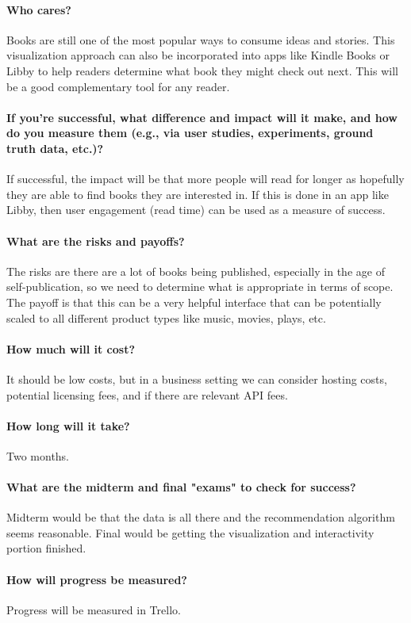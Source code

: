 \paragraph{Who cares?}Books are still one of the most popular ways to consume ideas and stories. This visualization approach can also be incorporated into apps like Kindle Books or Libby to help readers determine what book they might check out next. This will be a good complementary tool for any reader.
 
\paragraph{If you're successful, what difference and impact will it make, and how do you measure them (e.g., via user studies, experiments, ground truth data, etc.)?}If successful, the impact will be that more people will read for longer as hopefully they are able to find books they are interested in. If this is done in an app like Libby, then user engagement (read time) can be used as a measure of success.
 
\paragraph{What are the risks and payoffs?}The risks are there are a lot of books being published, especially in the age of self-publication, so we need to determine what is appropriate in terms of scope. The payoff is that this can be a very helpful interface that can be potentially scaled to all different product types like music, movies, plays, etc.

\paragraph{How much will it cost?}It should be low costs, but in a business setting we can consider hosting costs, potential licensing fees, and if there are relevant API fees.
 
\paragraph{How long will it take?}Two months.
 
\paragraph{What are the midterm and final "exams" to check for success?}Midterm would be that the data is all there and the recommendation algorithm seems reasonable. Final would be getting the visualization and interactivity portion finished.
 
\paragraph{How will progress be measured?}Progress will be measured in Trello.
